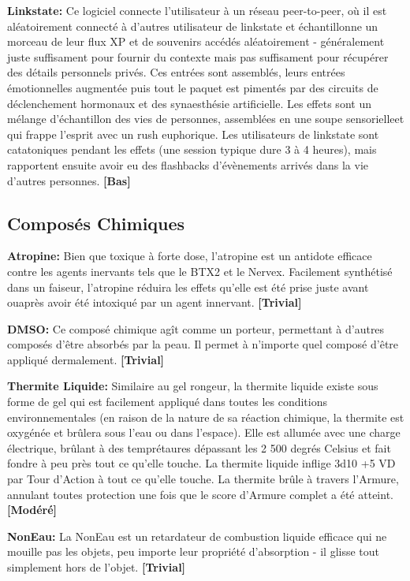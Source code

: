 \textbf{Linkstate:} Ce logiciel connecte l'utilisateur à un réseau peer-to-peer, où il est aléatoirement connecté à d'autres utilisateur de linkstate et échantillonne un morceau de leur flux XP et de souvenirs accédés aléatoirement - généralement juste suffisament pour fournir du contexte mais pas suffisament pour récupérer des détails personnels privés. Ces entrées sont assemblés, leurs entrées émotionnelles augmentée puis tout le paquet est pimentés par des circuits de déclenchement hormonaux et des synaesthésie artificielle. Les effets sont un mélange d'échantillon des vies de personnes, assemblées en une soupe sensorielleet qui frappe l'esprit avec un rush euphorique. Les utilisateurs de linkstate sont catatoniques pendant les effets (une session typique dure 3 à 4 heures), mais rapportent ensuite avoir eu des flashbacks d'évènements arrivés dans la vie d'autres personnes. \textbf{[Bas]} 



\subsection{Composés Chimiques} \label{sec:chemicals} 

\textbf{Atropine:} Bien que toxique à forte dose, l'atropine est un antidote efficace contre les agents inervants tels que le BTX2 et le Nervex. Facilement synthétisé dans un faiseur, l'atropine réduira les effets qu'elle est été prise juste avant ouaprès avoir été intoxiqué par un agent innervant. \textbf{[Trivial]} 

\textbf{DMSO:} Ce composé chimique agît comme un porteur, permettant à d'autres composés d'être absorbés par la peau. Il permet à n'importe quel composé d'être appliqué dermalement. \textbf{[Trivial]} 

\textbf{Thermite Liquide:} Similaire au gel rongeur, la thermite liquide existe sous forme de gel qui est facilement appliqué dans toutes les conditions environnementales (en raison de la nature de sa réaction chimique, la thermite est oxygénée et brûlera sous l'eau ou dans l'espace). Elle est allumée avec une charge électrique, brûlant à des temprétaures dépassant les 2 500 degrés Celsius et fait fondre à peu près tout ce qu'elle touche. La thermite liquide inflige 3d10 +5 VD par Tour d'Action à tout ce qu'elle touche. La thermite brûle à travers l'Armure, annulant toutes protection une fois que le score d'Armure complet a été atteint. \textbf{[Modéré]} 

\textbf{NonEau:} La NonEau est un retardateur de combustion liquide efficace qui ne mouille pas les objets, peu importe leur propriété d'absorption - il glisse tout simplement hors de l'objet. \textbf{[Trivial]} 

